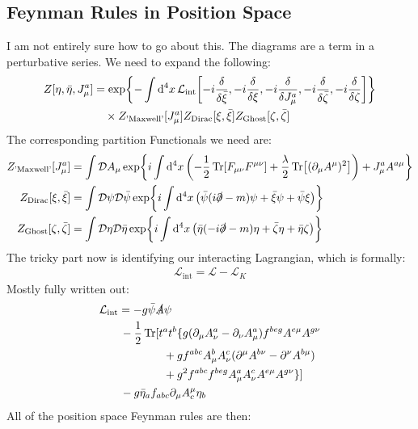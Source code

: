 \documentclass[12pt]{article}
\renewcommand{\L}{\mathcal{L}}
\newcommand{\cD}{\mathcal{D}}
\newcommand{\D}{\partial}
\newcommand{\psib}{\bar{\psi}}
\newcommand{\etab}{\bar{\eta}}
\newcommand{\xib}{\bar{\xi}}
\newcommand{\sla}[1]{\slashed{#1}}
\newcommand{\munu}{{\mu\nu}}
\renewcommand{\xib}{\bar\xi}
\newcommand{\zt}{\zeta}
\newcommand{\ztb}{\bar\zeta}
\begin{document}
\subsection{Feynman Rules in Position Space}
I am not entirely sure how to go about this. The diagrams are a term in a perturbative series. We need to expand the following:
\begin{align*}
  Z[\eta,\etab,J^a_\mu]&=\exp{-\int\dd[4]{x}
    \L_\text{int}
    \qty[-i\fdv{\xib},-i\fdv{\xi},-i\fdv{J^a_\mu},-i\fdv{\ztb},-i\fdv{\zt}]}\\
  &\quad \times Z_\text{'Maxwell'}[J_\mu^a] Z_\text{Dirac}[\xi,\xib]
  Z_\text{Ghost}[\zt,\ztb]
\end{align*}
The corresponding partition Functionals we need are:
\begin{align*}
  Z_\text{'Maxwell'}[J_\mu^a]&=\int\cD{A_\mu}\exp{i\int\dd[4]{x}
    \qty(-\frac12\Tr[F_\munu F^\munu]+\frac\lambda2\Tr[(\D_\mu A^\mu)^2])
    +J_\mu^aA^{a\mu}}\\
  Z_\text{Dirac}[\xi,\xib]&=\int\cD\psi\cD\psib\exp{i\int\dd[4]{x}
    \qty(\psib(i\sla{\D}-m)\psi+\xib\psi+\psib\xi)}\\
  Z_\text{Ghost}[\zt,\ztb]&=\int\cD\eta\cD\etab\exp{i\int\dd[4]{x}
    \qty(\etab(-i\sla{\D}-m)\eta+\ztb\eta+\etab\zt)}
\end{align*}
The tricky part now is identifying our interacting Lagrangian, which is formally:
\begin{align*}
  \L_\text{int}=\L-\L_K
\end{align*}
Mostly fully written out:
\begin{align*}
  \L_\text{int}&=-g\psib\sla{A}\psi\\
  &\,-\frac12\Tr\hspace{0pt}[t^at^b\{
  g(\D_\mu A^a_\nu-\D_\nu A^a_\mu)f^{beg}A^{e\mu}A^{g\nu} \\
  &\qquad\qquad+g f^{abc}A_\mu^b A_\nu^c(\D^\mu A^{b\nu}-\D^\nu A^{b\mu})\\
  &\qquad\qquad+g^2f^{abc}f^{beg}A_\mu^a A_\nu^cA^{e\mu}A^{g\nu}\}]\\
  &\,-g\etab_af_{abc}\D_\mu A^\mu_c\eta_b
\end{align*}
All of the position space Feynman rules are then:
\end{document}
